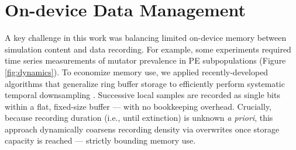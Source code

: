 

\section{On-device Data Management}
\label{sec:dynamics}



A key challenge in this work was balancing limited on-device memory between simulation content and data recording.
For example, some experiments required time series measurements of mutator prevalence in PE subpopulations (Figure \ref{fig:dynamics}).
To economize memory use, we applied recently-developed algorithms that generalize ring buffer storage to efficiently perform systematic temporal downsampling \citep{moreno2024algorithms,gunther2014algorithm}.
Successive local samples are recorded as single bits within a flat, fixed-size buffer --- with no bookkeeping overhead.
Crucially, because recording duration (i.e., until extinction) is unknown \textit{a priori}, this approach dynamically coarsens recording density via overwrites once storage capacity is reached --- strictly bounding memory use.

